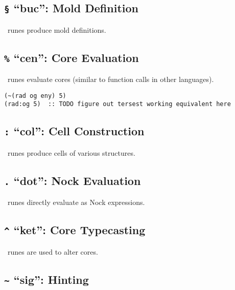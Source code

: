 \subsection{\texttt{\S} “buc”:  Mold Definition}

\pbuc~runes produce mold definitions.

\subsection{\texttt{\%} “cen”:  Core Evaluation}

\pcen~runes evaluate cores (similar to function calls in other languages).

\begin{lstlisting}
(~(rad og eny) 5)
(rad:og 5)  :: TODO figure out tersest working equivalent here
\end{lstlisting}

\subsection{\texttt{:} “col”:  Cell Construction}

\pcol~runes produce cells of various structures.

\subsection{\texttt{.} “dot”:  Nock Evaluation}

\pdot~runes directly evaluate as Nock expressions.

\subsection{\texttt{\^} “ket”:  Core Typecasting}

\pket~runes are used to alter cores.

\subsection{\texttt{\textasciitilde} “sig”:  Hinting}


